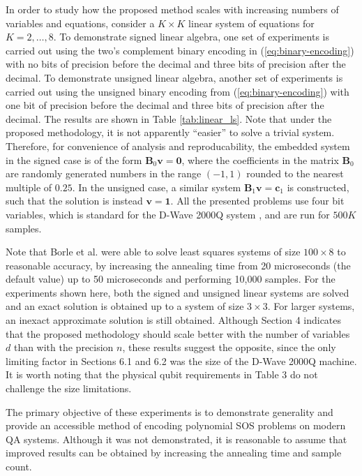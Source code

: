 In order to study how the proposed method scales with increasing numbers of variables and equations, consider a $K \times K$ linear system of equations for $K = 2,\ldots,8$.
To demonstrate signed linear algebra, one set of experiments is carried out using the two's complement binary encoding in (\ref{eq:binary-encoding}) with no bits of precision before the decimal and three bits of precision after the decimal.
To demonstrate unsigned linear algebra, another set of experiments is carried out using the unsigned binary encoding from (\ref{eq:binary-encoding}) with one bit of precision before the decimal and three bits of precision after the decimal.
The results are shown in Table \ref{tab:linear_ls}.
Note that under the proposed methodology, it is not apparently ``easier'' to solve a trivial system.
Therefore, for convenience of analysis and reproducability, the embedded system in the signed case is of the form $\mathbf{B}_0 \mathbf{v}=\mathbf{0}$, where the coefficients in the matrix $\mathbf{B}_0$ are randomly generated numbers in the range $(-1,1)$ rounded to the nearest multiple of $0.25$.
In the unsigned case, a similar system $\mathbf{B}_1 \mathbf{v} = \mathbf{c}_1$ is constructed, such that the solution is instead $\mathbf{v}=\mathbf{1}$.
All the presented problems use four bit variables, which is standard for the D-Wave 2000Q system \cite{borle2019analyzing}, and are run for $500 K$ samples.



Note that Borle et al. \cite{borle2019analyzing} were able to solve least squares systems of size $100\times 8$ to reasonable accuracy, by increasing the annealing time from 20 microseconds (the default value) up to 50 microseconds and performing 10,000 samples.
For the experiments shown here, both the signed and unsigned linear systems are solved and an exact solution is obtained up to a system of size $3\times 3$. 
For larger systems, an inexact approximate solution is still obtained.
Although Section 4 indicates that the proposed methodology should scale better with the number of variables $d$ than with the precision $n$, these results suggest the opposite, since the only limiting factor in Sections 6.1 and 6.2 was the size of the D-Wave 2000Q machine.
It is worth noting that the physical qubit requirements in Table 3 do not challenge the size limitations.

The primary objective of these experiments is to demonstrate generality and provide an accessible method of encoding polynomial SOS problems on modern QA systems.
Although it was not demonstrated, it is reasonable to assume that improved results can be obtained by increasing the annealing time and sample count.
